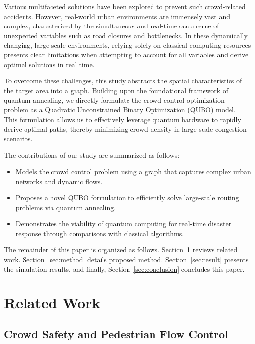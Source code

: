 \documentclass[twocolumn,a4paper]{article} %
\begin{document}
Various multifaceted solutions have been explored to prevent such crowd-related accidents\cite{Nishinari2024}. However, real-world urban environments are immensely vast and complex, characterized by the simultaneous and real-time occurrence of unexpected variables such as road closures and bottlenecks. In these dynamically changing, large-scale environments, relying solely on classical computing resources presents clear limitations when attempting to account for all variables and derive optimal solutions in real time.

To overcome these challenges, this study abstracts the spatial characteristics of the target area into a graph. Building upon the foundational framework of quantum annealing\cite{Kadowaki1998}, we directly formulate the crowd control optimization problem as a Quadratic Unconstrained Binary Optimization (QUBO) model. This formulation allows us to effectively leverage quantum hardware to rapidly derive optimal paths, thereby minimizing crowd density in large-scale congestion scenarios.

The contributions of our study are summarized as follows:
\begin{itemize}
    \setlength{\itemsep}{0pt}       %
    \setlength{\parsep}{0pt}        %
    \setlength{\parskip}{0pt}
    
    \item[(1)] Models the crowd control problem using a graph that captures complex urban networks and dynamic flows.
    \item[(2)] Proposes a novel QUBO formulation to efficiently solve large-scale routing problems via quantum annealing.
    \item[(3)] Demonstrates the viability of quantum computing for real-time disaster response through comparisons with classical algorithms.
\end{itemize}

The remainder of this paper is organized as follows. Section~\ref{sec:related} reviews related work. Section~\ref{sec:method} details proposed method. Section~\ref{sec:result} presents the simulation results, and finally, Section~\ref{sec:conclusion} concludes this paper.

\section{Related Work}
\label{sec:related}

\subsection{Crowd Safety and Pedestrian Flow Control}
\label{subsec:related_crowd}
\end{document}
